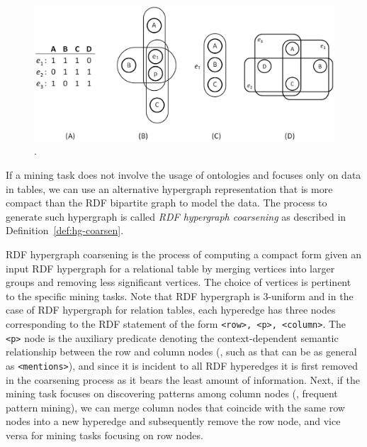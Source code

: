 \begin{figure}[tbh]
\centering
\includegraphics[width=\textwidth]{fig/hypergraph-coarsening.eps}
\caption{\label{fig:hypergraph-coarsening} .}
\end{figure}

If a mining task does not involve the usage of ontologies and focuses only on data in tables, we can use an alternative hypergraph representation that is more compact than the RDF bipartite graph to model the data. The process to generate such hypergraph is called \emph{RDF hypergraph coarsening} as described in Definition~\ref{def:hg-coarsen}.

\begin{mydef}
\label{def:hg-coarsen}
RDF hypergraph coarsening is the process of computing a compact form given an input RDF hypergraph for a relational table by merging vertices into larger groups and removing less significant vertices. The choice of vertices is pertinent to the specific mining tasks. Note that RDF hypergraph is 3-uniform and in the case of RDF hypergraph for relation tables, each hyperedge has three nodes corresponding to the RDF statement of the form \texttt{<row>, <p>, <column>}. The \texttt{<p>} node is the auxiliary predicate denoting the context-dependent semantic relationship between the row and column nodes (\eg, such as that can be as general as \texttt{<mentions>}), and since it is incident to all RDF hyperedges it is first removed in the coarsening process as it bears the least amount of information. Next, if the mining task focuses on discovering patterns among column nodes (\eg, frequent pattern mining), we can merge column nodes that coincide with the same row nodes into a new hyperedge and subsequently remove the row node, and vice versa for mining tasks focusing on row nodes.
\end{mydef}

